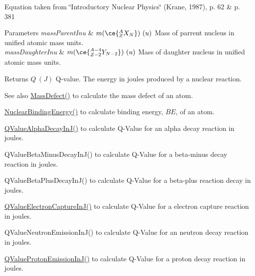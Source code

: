 Equation taken from \char`\"{}\+Introductory Nuclear Physics\char`\"{} (Krane, 1987), p. 62 \& p. 381


\begin{DoxyParams}{Parameters}
{\em mass\+Parent\+Inu} & $m(\ce{ ^{A}_{Z}X_{N} })\ (u)$ Mass of parrent nucleus in unified atomic mass units. \\
\hline
{\em mass\+Daughter\+Inu} & $m(\ce{ ^{A-4}_{Z-2}Y_{N-2} })\ (u)$ Mass of daughter nucleus in unified atomic mass units. \\
\hline
\end{DoxyParams}
\begin{DoxyReturn}{Returns}
$Q\ (J)$ Q-\/value. The energy in joules produced by a nuclear reaction. 
\end{DoxyReturn}
\begin{DoxySeeAlso}{See also}
\mbox{\hyperlink{group___e_g_x_phys-_mass_defect_gae89f2dfa65992c0314adc2440b2f582a}{Mass\+Defect()}} to calculate the mass defect of an atom. 

\mbox{\hyperlink{group___e_g_x_phys-_nuclear_binding_energy_gab6832bf15ead7b4e867e759e0a2a078e}{Nuclear\+Binding\+Energy()}} to calculate binding energy, $BE$, of an atom. 

\mbox{\hyperlink{group___e_g_x_phys-_q_value-_alpha_gab8a50c18f6de3c1b6ed280c26c3ff3a5}{Q\+Value\+Alpha\+Decay\+In\+J()}} to calculate Q-\/\+Value for an alpha decay reaction in joules. 

Q\+Value\+Beta\+Minus\+Decay\+In\+J() to calculate Q-\/\+Value for a beta-\/minus decay reaction in joules. 

Q\+Value\+Beta\+Plus\+Decay\+In\+J() to calculate Q-\/\+Value for a beta-\/plus reaction decay in joules. 

\mbox{\hyperlink{group___e_g_x_phys-_q_value-_electron_capture_gaf2569f9c706130b730dcf55695780263}{Q\+Value\+Electron\+Capture\+In\+J()}} to calculate Q-\/\+Value for a electron capture reaction in joules. 

Q\+Value\+Neutron\+Emission\+In\+J() to calculate Q-\/\+Value for an neutron decay reaction in joules. 

\mbox{\hyperlink{group___e_g_x_phys-_q_value-_proton_ga41f19b0d9a2dc06e89de44aaa2d48d62}{Q\+Value\+Proton\+Emission\+In\+J()}} to calculate Q-\/\+Value for a proton decay reaction in joules. 
\end{DoxySeeAlso}
\mbox{\label{group___e_g_x_phys-_q_value-_alpha_ga4f9a38d3ad4bf93471a0affb493b6e72}} 
